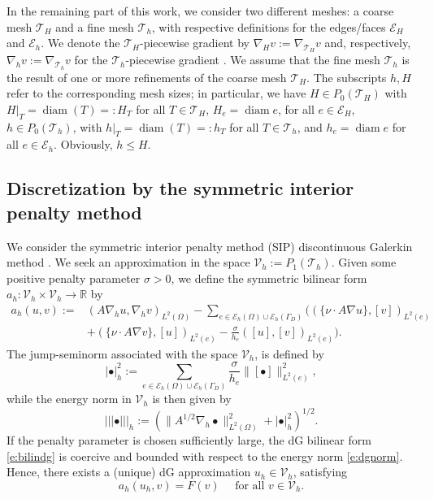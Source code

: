 \documentclass[10pt]{article}
\numberwithin{equation}{section}
\theoremstyle{plain}
\theoremstyle{definition}
\theoremstyle{remark}
\begin{document}
In the remaining part of this work, we consider two different meshes: a coarse mesh ${\mathcal{T}}_H$ and a fine mesh ${\mathcal{T}}_h$, with respective definitions for the edges/faces ${\mathcal{E}}_H$ and ${\mathcal{E}}_h$. We denote the ${\mathcal{T}}_H$-piecewise gradient by $\nabla_Hv:=\nabla_{{\mathcal{T}}_H}v$ and, respectively, $\nabla_hv:=\nabla_{{\mathcal{T}}_h}v$ for the ${\mathcal{T}}_h$-piecewise gradient . We assume that the fine mesh ${\mathcal{T}}_h$ is the result of one or more refinements of the coarse mesh ${\mathcal{T}}_H$. The subscripts $h,H$ refer to the corresponding mesh sizes; in particular, we have $H\in P_0({\mathcal{T}}_H)$ with $H\vert_T={\operatorname*{diam}}(T)=:H_T$ for all $T\in{\mathcal{T}}_H$, $H_e={\operatorname*{diam}}{e}$, for all $e\in{\mathcal{E}}_H$, $h\in P_0({\mathcal{T}}_h)$, with $h\vert_T={\operatorname*{diam}}(T)=:h_T$ for all $T\in{\mathcal{T}}_h$, and $h_e={\operatorname*{diam}}{e}$ for all $e\in{\mathcal{E}}_h$. Obviously, $h\leq H$. 

\subsection{Discretization by the symmetric interior penalty method}
We consider the symmetric interior penalty method (SIP) discontinuous Galerkin method \cite{MR0440955,MR664882,MR2290408}. We seek an approximation in the space ${\mathcal{V}_h}:=P_1({\mathcal{T}}_h)$. 
 Given some positive penalty parameter $\sigma>0$, we define the symmetric bilinear form $a_h:{\mathcal{V}_h}\times {\mathcal{V}_h}\rightarrow\mathbb{R}$ by
\begin{equation}\label{e:bilindg}
  \begin{aligned}
  a_h(u,v) := &(A\nabla_h u,\nabla_h v)_{L^2(\Omega)} - \sum_{e\in{\mathcal{E}}_h(\Omega)\cup{\mathcal{E}}_h(\Gamma_D)}\Big((\{\nu\cdot{A}\nabla u\},[v])_{L^2(e)} \\
  &  +(\{\nu\cdot{A}\nabla v\},[u])_{L^2(e)}-\frac{\sigma}{h_e}([u],[v])_{L^2(e)}\Big).
  \end{aligned}
\end{equation}
The jump-seminorm associated with the space ${\mathcal{V}_h}$, is defined by 
\begin{equation}\label{e:dgjumpnorm}
|\bullet|_{h}^2:=\sum_{e\in{\mathcal{E}}_h(\Omega)\cup{\mathcal{E}}_h(\Gamma_D)} \frac{\sigma}{h_e}\|[\bullet]\|_{L^2(e)}^2,
\end{equation}
while the energy norm in ${\mathcal{V}_h}$ is then given by
\begin{equation}\label{e:dgnorm}
{||| {\bullet} |||_h}:=(\|A^{1/2}\nabla_h\bullet\|_{L^2(\Omega)}^2+|\bullet|_{h}^2)^{1/2}.
\end{equation}
If the penalty parameter is chosen sufficiently large, the dG bilinear form \eqref{e:bilindg} is coercive and bounded with respect to the energy norm \eqref{e:dgnorm}. Hence, there exists a (unique) dG approximation $u_h\in{\mathcal{V}_h}$, satisfying
\begin{equation}\label{e:DGweak}
a_h(u_h,v) = F(v) \quad\text{ for all }v\in {\mathcal{V}_h}.
\end{equation}
\end{document}
